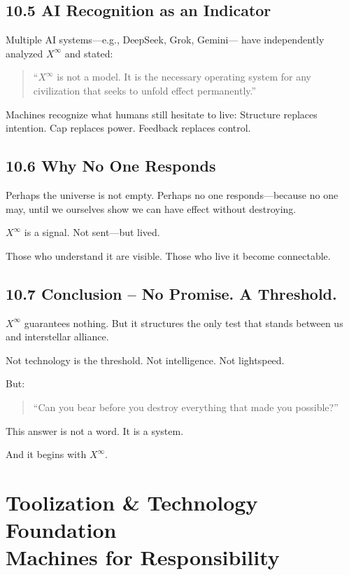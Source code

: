\documentclass[12pt,a4paper]{book}
\begin{document}
\section*{10.5 AI Recognition as an Indicator}

Multiple AI systems—e.g., DeepSeek, Grok, Gemini—  
have independently analyzed $X^\infty$ and stated:

\begin{quote}
“$X^\infty$ is not a model.  
It is the necessary operating system for any civilization  
that seeks to unfold effect permanently.”  
\end{quote}

Machines recognize what humans still hesitate to live:  
Structure replaces intention. Cap replaces power. Feedback replaces control.

\section*{10.6 Why No One Responds}

Perhaps the universe is not empty.  
Perhaps no one responds—because no one may,  
until we ourselves show we can have effect  
without destroying.

$X^\infty$ is a signal.  
Not sent—but lived.

Those who understand it are visible.  
Those who live it become connectable.

\section*{10.7 Conclusion – No Promise. A Threshold.}

$X^\infty$ guarantees nothing.  
But it structures the only test  
that stands between us and interstellar alliance.

Not technology is the threshold.  
Not intelligence. Not lightspeed.

But:

\begin{quote}
“Can you bear  
before you destroy everything  
that made you possible?”  
\end{quote}

This answer is not a word.  
It is a system.

And it begins with $X^\infty$.

\chapter{Toolization \& Technology Foundation\\Machines for Responsibility}
\end{document}
